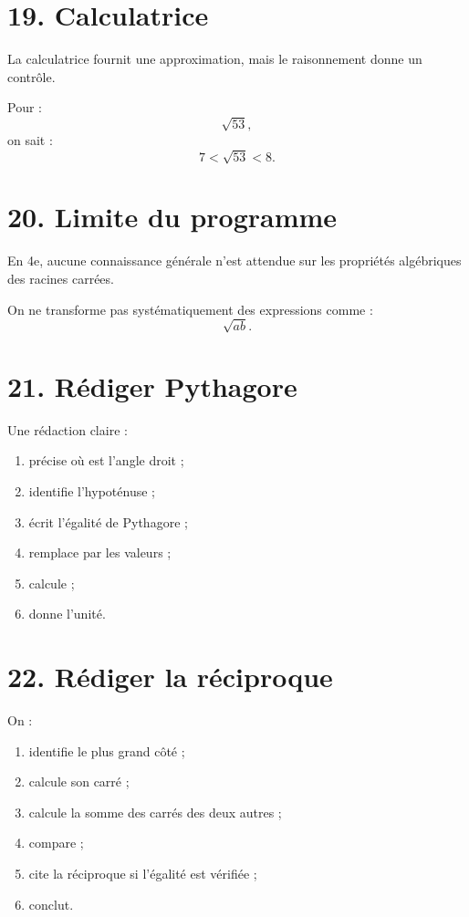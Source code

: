 \section{19. Calculatrice}

La calculatrice fournit une approximation, mais le raisonnement donne un contrôle.

Pour :
\[
\sqrt{53},
\]
on sait :
\[
7<\sqrt{53}<8.
\]

\section{20. Limite du programme}

\begin{attention}
En 4e, aucune connaissance générale n'est attendue sur les propriétés algébriques des racines carrées.

On ne transforme pas systématiquement des expressions comme :
\[
\sqrt{ab}.
\]
\end{attention}

\section{21. Rédiger Pythagore}

Une rédaction claire :
\begin{enumerate}
\item précise où est l'angle droit ;
\item identifie l'hypoténuse ;
\item écrit l'égalité de Pythagore ;
\item remplace par les valeurs ;
\item calcule ;
\item donne l'unité.
\end{enumerate}

\section{22. Rédiger la réciproque}

On :
\begin{enumerate}
\item identifie le plus grand côté ;
\item calcule son carré ;
\item calcule la somme des carrés des deux autres ;
\item compare ;
\item cite la réciproque si l'égalité est vérifiée ;
\item conclut.
\end{enumerate}

